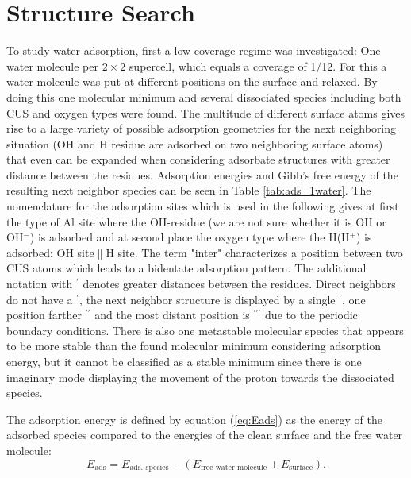 \documentclass[11pt,DIV=13,BCOR=5mm,a4paper,headinclude]{scrbook}
\begin{document}
\section{Structure Search}\label{structure_search11-20}
To study water adsorption, first a low coverage regime was investigated: One water molecule per $2\times 2$ supercell, which equals a coverage of 1/12.
For this a water molecule was put at different positions on the surface and relaxed.
By doing this one molecular minimum and several dissociated species including both CUS and oxygen types were found.
The multitude of different surface atoms gives rise to a large variety of possible adsorption geometries for the next neighboring situation (OH and H residue are adsorbed on two neighboring surface atoms) that even can be expanded when considering adsorbate structures with greater distance between the residues.
Adsorption energies and Gibb's free energy of the resulting next neighbor species can be seen in Table \ref{tab:ads_1water}.
The nomenclature for the adsorption sites which is used in the following gives at first the type of Al site where the OH-residue (we are not sure whether it is OH or OH$^-$) is adsorbed and at second place the oxygen type where the H(H$^+$) is adsorbed: OH site$\parallel$H site.
The term "inter" characterizes a position between two CUS atoms which leads to a bidentate adsorption pattern.
The additional notation with $^\prime$ denotes greater distances between the residues.
Direct neighbors do not have a $^\prime$, the next neighbor structure is displayed by a single $^\prime$, one position farther $^{\prime\prime}$ and the most distant position is $^{\prime\prime\prime}$ due to the periodic boundary conditions.
There is also one metastable molecular species that appears to be more stable than the found molecular minimum considering adsorption energy, but it cannot be classified as a stable minimum since there is one imaginary mode displaying the movement of the proton towards the dissociated species.


The adsorption energy is defined by equation (\ref{eq:Eads}) as the energy of the adsorbed species compared to the energies of the clean surface and the free water molecule:
\begin{equation}\label{eq:Eads}
 E_\textrm{ads}=E_\text{ads. species}-(E_\text{free water molecule}+E_\text{surface}).
\end{equation}
\end{document}
